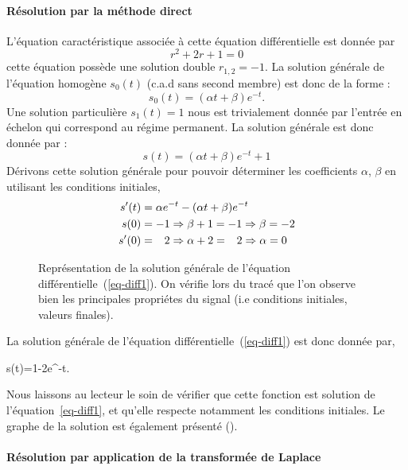 \paragraph{Résolution par la méthode direct}
L'équation caractéristique associée à cette équation différentielle est donnée par 
$$
r^2+2r+1=0
$$
cette équation possède une solution double $r_{1,2}=-1$.
La solution générale de l'équation homogène $s_0(t)$ (c.a.d sans second membre) 
est donc de la forme :
$$
s_0(t)=(\alpha t+\beta)e^{-t}.
$$
Une solution particulière $s_1(t)=1$ nous est trivialement donnée par l'entrée en échelon qui correspond au 
régime permanent.
La solution générale est donc donnée par :
$$
s(t)=(\alpha t+\beta)e^{-t}+1
$$
Dérivons cette solution générale pour pouvoir déterminer les coefficients $\alpha$, $\beta$ en utilisant
les conditions initiales,
\begin{align*}
    s'(t)&=\alpha e^{-t}-(\alpha t+\beta)e^{-t}\\
     s(0)&=-1\Rightarrow\beta+1=-1\Rightarrow\beta=-2 \\
    s'(0)&=\hphantom{-}2\Rightarrow\alpha+2=\hphantom{-}2\Rightarrow\alpha=0
\end{align*}

\begin{figure}[!t]
    \centering
    
    \caption{Représentation de la solution générale de l'équation différentielle~(\ref{eq-diff1}). On vérifie lors 
             du tracé que l'on observe bien les principales propriétes du signal (i.e conditions initiales, 
             valeurs finales).\label{fig-solution}}
\end{figure}

La solution générale de l'équation différentielle~(\ref{eq-diff1}) est donc donnée par, 
\begin{bequation}
s(t)=1-2e^{-t}.
\end{bequation}
Nous laissons au lecteur le soin de vérifier que cette fonction est solution 
de l'équation~\ref{eq-diff1}, et qu'elle respecte notamment les conditions initiales. 
Le graphe de la solution est également présenté ().

\paragraph{Résolution par application de la transformée de Laplace}


